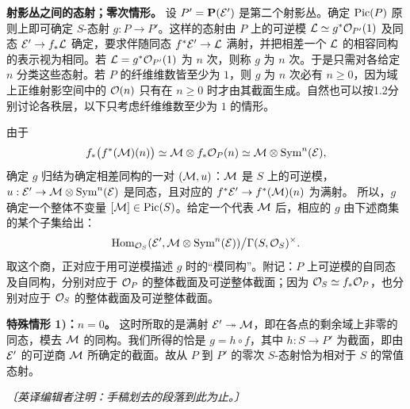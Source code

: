 \medskip\noindent\textbf{射影丛之间的态射；零次情形。}
设 \(P'=\mathbf P(\mathcal E')\) 是第二个射影丛。确定 \(\operatorname{Pic}(P)\) 原则上即可确定 \(S\)-态射 \(g:P\to P'\)。这样的态射由 \(P\) 上的可逆模 \(\mathcal L\simeq g^*\mathcal O_{P'}(1)\) 及同态 \(\mathcal E'\to f_*\mathcal L\) 确定，要求伴随同态 \(f^*\mathcal E'\to\mathcal L\) 满射，并把相差一个 \(\mathcal L\) 的相容同构的表示视为相同。若 \(\mathcal L=g^*\mathcal O_{P'}(1)\) 为 \(n\) 次，则称 \(g\) 为 \(n\) 次。于是只需对各给定 \(n\) 分类这些态射。若 \(P\) 的纤维维数皆至少为 \(1\)，则 \(g\) 为 \(n\) 次必有 \(n\ge0\)，因为域上正维射影空间中的 \(\mathcal O(n)\) 只有在 \(n\ge0\) 时才由其截面生成。自然也可以按1.2分别讨论各秩层，以下只考虑纤维维数至少为 \(1\) 的情形。

由于
\[
 f_*\bigl(f^*(\mathcal M)(n)\bigr)
   \simeq \mathcal M\otimes f_*\mathcal O_P(n)
   \simeq \mathcal M\otimes\operatorname{Sym}^n(\mathcal E),
\]
确定 \(g\) 归结为确定相差同构的一对 \((\mathcal M,u)\)：\(\mathcal M\) 是 \(S\) 上的可逆模，\(u:\mathcal E'\to\mathcal M\otimes\operatorname{Sym}^n(\mathcal E)\) 是同态，且对应的 \(f^*\mathcal E'\to f^*(\mathcal M)(n)\) 为满射。
所以，\(g\) 确定一个整体不变量 \([\mathcal M]\in\operatorname{Pic}(S)\)。给定一个代表 \(\mathcal M\) 后，相应的 \(g\) 由下述商集的某个子集给出：
\[
 \operatorname{Hom}_{\mathcal O_S}(\mathcal E',\mathcal M\otimes\operatorname{Sym}^n(\mathcal E))
   \big/\Gamma(S,\mathcal O_S)^\times .
\]
取这个商，正对应于用可逆模描述 \(g\) 时的“模同构”。附记：\(P\) 上可逆模的自同态及自同构，分别对应于 \(\mathcal O_P\) 的整体截面及可逆整体截面；因为 \(\mathcal O_S\simeq f_*\mathcal O_P\)，也分别对应于 \(\mathcal O_S\) 的整体截面及可逆整体截面。

\medskip\noindent\textbf{特殊情形 1)：\(n=0\)。}
这时所取的是满射 \(\mathcal E'\twoheadrightarrow\mathcal M\)，即在各点的剩余域上非零的同态，模去 \(\mathcal M\) 的同构。我们所得的恰是 \(g=h\circ f\)，其中 \(h:S\to P'\) 为截面，即由 \(\mathcal E'\) 的可逆商 \(\mathcal M\) 所确定的截面。故从 \(P\) 到 \(P'\) 的零次 \(S\)-态射恰为相对于 \(S\) 的常值态射。

\emph{〔英译编辑者注明：手稿划去的段落到此为止。〕}
\par\endgroup
